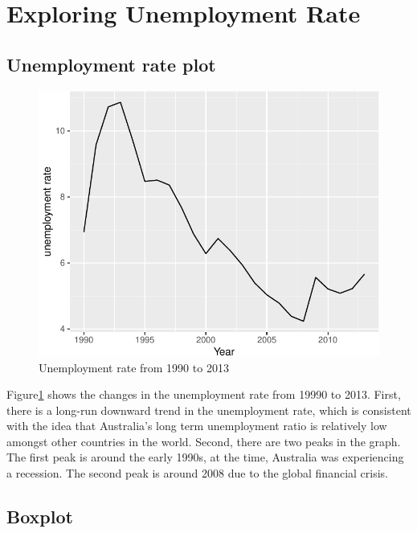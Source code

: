 \documentclass[11pt,a4paper,]{article}
\begin{document}
\section{Exploring Unemployment Rate}

\subsection{Unemployment rate plot}

\begin{figure}[H]

{\centering \includegraphics{Figures/unemp-1} 

}

\caption{Unemployment rate from 1990 to 2013}\label{fig:unemp}
\end{figure}

Figure\ref{fig:unemp} shows the changes in the unemployment rate from 19990 to 2013. First, there is a long-run downward trend in the unemployment rate, which is consistent with the idea that Australia's long term unemployment ratio is relatively low amongst other countries in the world. Second, there are two peaks in the graph. The first peak is around the early 1990s, at the time, Australia was experiencing a recession. The second peak is around 2008 due to the global financial crisis.

\subsection{Boxplot}
\end{document}
